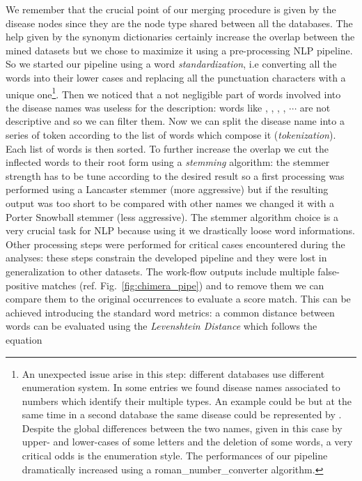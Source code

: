 \documentclass{standalone}
\begin{document}
We remember that the crucial point of our merging procedure is given by the disease nodes since they are the node type shared between all the databases.
The help given by the synonym dictionaries certainly increase the overlap between the mined datasets but we chose to maximize it using a pre-processing NLP pipeline.
So we started our pipeline using a word \emph{standardization}, i.e converting all the words into their lower cases and replacing all the punctuation characters with a unique one\footnote{
  An unexpected issue arise in this step: different databases use different enumeration system.
  In some entries we found disease names associated to numbers which identify their multiple types.
  An example could be  but at the same time in a second database the same disease could be represented by .
  Despite the global differences between the two names, given in this case by upper- and lower-cases of some letters and the deletion of some words, a very critical odds is the enumeration style.
  The performances of our pipeline dramatically increased using a \textsf{roman\_number\_converter} algorithm.
}.
Then we noticed that a not negligible part of words involved into the disease names was useless for the description: words like , , , , $\cdots$ are not descriptive and so we can filter them.
Now we can split the disease name into a series of token according to the list of words which compose it (\emph{tokenization}).
Each list of words is then sorted.
To further increase the overlap we cut the inflected words to their root form using a \emph{stemming} algorithm: the stemmer strength has to be tune according to the desired result so a first processing was performed using a \textsf{Lancaster} stemmer (more aggressive) but if the resulting output was too short to be compared with other names we changed it with a \textsf{Porter Snowball} stemmer (less aggressive).
The stemmer algorithm choice is a very crucial task for NLP because using it we drastically loose word informations.
Other processing steps were performed for critical cases encountered during the analyses: these steps constrain the developed pipeline and they were lost in generalization to other datasets.
The work-flow outputs include multiple false-positive matches (ref. Fig.~\ref{fig:chimera_pipe}) and to remove them we can compare them to the original occurrences to evaluate a score match.
This can be achieved introducing the standard word metrics: a common distance between words can be evaluated using the \emph{Levenshtein Distance} which follows the equation
\end{document}
